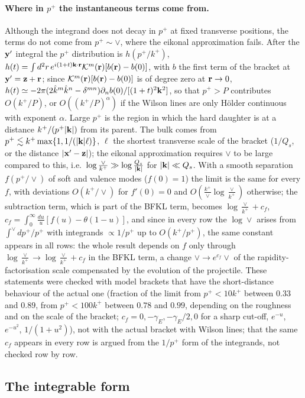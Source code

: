 \paragraph{Where in $p^+$ the instantaneous terms come from.} Although the integrand does not decay in $p^+$ at fixed transverse positions, the terms do not come from $p^+\sim\vee$, where the eikonal approximation fails. After the $\mathbf{y}'$ integral the $p^+$ distribution is $h(p^+/k^+)$, $h(t)=\int d^2r\,e^{i(1+t)\mathbf{k}\cdot\mathbf{r}}\mathcal{K}^m(\mathbf{r})[b(\mathbf{r})-b(0)]$, with $b$ the first term of the bracket at $\mathbf{y}'=\mathbf{z}+\mathbf{r}$; since $\mathcal{K}^m(\mathbf{r})[b(\mathbf{r})-b(0)]$ is of degree zero at $\mathbf{r}\to0$, $h(t)\simeq-2\pi(2\hat k^m\hat k^n-\delta^{mn})\partial_nb(0)/[(1+t)^2\mathbf{k}^2]$, so that $p^+>P$ contributes $O(k^+/P)$, or $O((k^+/P)^\alpha)$ if the Wilson lines are only H\"older continuous with exponent $\alpha$. Large $p^+$ is the region in which the hard daughter is at a distance $k^+/(p^+|\mathbf{k}|)$ from its parent. The bulk comes from $p^+\lesssim k^+\max\{1,1/(|\mathbf{k}|\ell)\}$, $\ell$ the shortest transverse scale of the bracket ($1/Q_s$, or the distance $|\mathbf{x}'-\mathbf{z}|$); the eikonal approximation requires $\vee$ to be large compared to this, i.e.\ $\log\frac{\vee}{k^+}\gg\log\frac{Q_s}{|\mathbf{k}|}$ for $|\mathbf{k}|\ll Q_s$. With a smooth separation $f(p^+/\vee)$ of soft and valence modes ($f(0)=1$) the limit is the same for every $f$, with deviations $O(k^+/\vee)$ for $f'(0)=0$ and $O(\frac{k^+}{\vee}\log\frac{\vee}{k^+})$ otherwise; the subtraction term, which is part of the BFKL term, becomes $\log\frac{\vee}{k^+}+c_f$, $c_f=\int_0^\infty\frac{du}{u}[f(u)-\theta(1-u)]$, and since in every row the $\log\vee$ arises from $\int^\vee dp^+/p^+$ with integrands $\propto1/p^+$ up to $O(k^+/p^+)$, the same constant appears in all rows: the whole result depends on $f$ only through $\log\frac{\vee}{k^+}\to\log\frac{\vee}{k^+}+c_f$ in the BFKL term, a change $\vee\to e^{c_f}\vee$ of the rapidity-factorisation scale compensated by the evolution of the projectile. These statements were checked with model brackets that have the short-distance behaviour of the actual one (fraction of the limit from $p^+<10k^+$ between $0.33$ and $0.89$, from $p^+<100k^+$ between $0.78$ and $0.99$, depending on the roughness and on the scale of the bracket; $c_f=0,-\gamma_E,-\gamma_E/2,0$ for a sharp cut-off, $e^{-u}$, $e^{-u^2}$, $1/(1+u^2)$), not with the actual bracket with Wilson lines; that the same $c_f$ appears in every row is argued from the $1/p^+$ form of the integrands, not checked row by row.

\subsection{The integrable form}\label{sec:fin_integrable}

